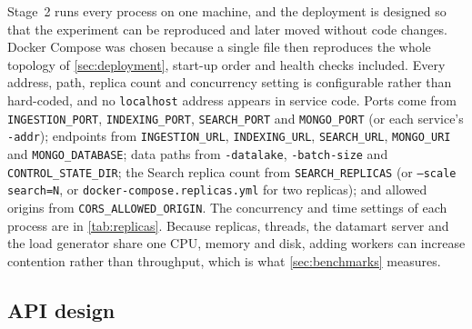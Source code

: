 \documentclass[10pt,a4paper]{article}
\newcommand{\code}[1]{\texttt{#1}}
\begin{document}
Stage~2 runs every process on one machine, and the deployment is designed so
that the experiment can be reproduced and later moved without code changes.
Docker Compose was chosen because a single file then reproduces the whole
topology of \cref{sec:deployment}, start-up order and health checks included.
Every address, path, replica count and concurrency setting is configurable
rather than hard-coded, and no \code{localhost} address appears in service
code. Ports come from \code{INGESTION\_PORT}, \code{INDEXING\_PORT},
\code{SEARCH\_PORT} and \code{MONGO\_PORT} (or each service's \code{-addr});
endpoints from \code{INGESTION\_URL}, \code{INDEXING\_URL}, \code{SEARCH\_URL},
\code{MONGO\_URI} and \code{MONGO\_DATABASE}; data paths from
\code{-datalake}, \code{-batch-size} and \code{CONTROL\_STATE\_DIR}; the
Search replica count from \code{SEARCH\_REPLICAS} (or \code{--scale search=N},
or \code{docker-compose.replicas.yml} for two replicas); and allowed origins
from \code{CORS\_ALLOWED\_ORIGIN}. The concurrency and time settings of each
process are in \cref{tab:replicas}. Because replicas, threads, the datamart
server and the load generator share one CPU, memory and disk, adding workers
can increase contention rather than throughput, which is what
\cref{sec:benchmarks} measures.

\subsection{API design}
\label{sec:decision-api}
\end{document}
